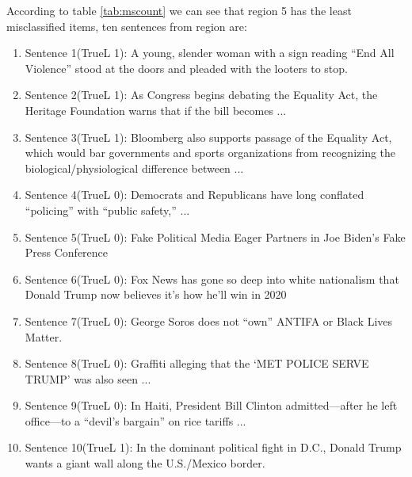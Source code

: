 \documentclass[11pt,a4paper]{article}
\begin{document}
According to table \ref{tab:mscount} we can see that region 5 has the least misclassified items, ten sentences from region are:
\begin{enumerate}
  \item Sentence 1(TrueL 1): A young, slender woman with a sign reading “End All Violence” stood at the doors and pleaded with the looters to stop.
  \item Sentence 2(TrueL 1): As Congress begins debating the Equality Act, the Heritage Foundation warns that if the bill becomes ...
  \item Sentence 3(TrueL 1): Bloomberg also supports passage of the Equality Act, which would bar governments and sports organizations from recognizing the biological/physiological difference between ...
  \item Sentence 4(TrueL 0): Democrats and Republicans have long conflated “policing” with “public safety,” ...
  \item Sentence 5(TrueL 0): Fake Political Media Eager Partners in Joe Biden’s Fake Press Conference
  \item Sentence 6(TrueL 0): Fox News has gone so deep into white nationalism that Donald Trump now believes it’s how he’ll win in 2020
  \item Sentence 7(TrueL 0): George Soros does not “own” ANTIFA or Black Lives Matter.
  \item Sentence 8(TrueL 0): Graffiti alleging that the ‘MET POLICE SERVE TRUMP’ was also seen ...
  \item Sentence 9(TrueL 0): In Haiti, President Bill Clinton admitted—after he left office—to a “devil’s bargain” on rice tariffs ...
  \item Sentence 10(TrueL 1): In the dominant political fight in D.C., Donald Trump wants a giant wall along the U.S./Mexico border.
\end{enumerate}
\end{document}
